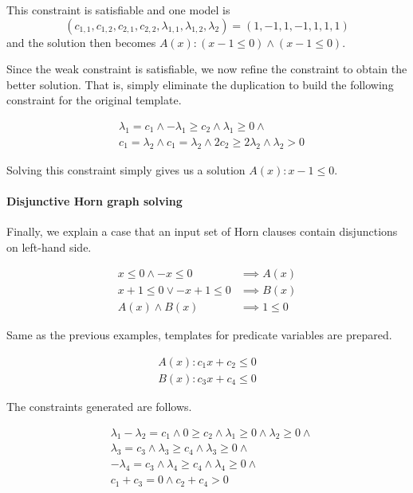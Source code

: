 \documentclass[a4paper,12pt]{article}
\begin{document}
This constraint is satisfiable and one model is
\[ ( c_{1,1}, c_{1,2}, c_{2,1}, c_{2,2}, \lambda_{1,1}, \lambda_{1,2}, \lambda_2 ) =
( 1, -1, 1, -1, 1, 1, 1 ) \] and the solution then becomes
$A(x) : (x -1 \leq 0) \wedge (x -1 \leq 0)$.

Since the weak constraint is satisfiable, we now refine the constraint
to obtain the better solution. That is, simply eliminate the
duplication to build the following constraint for the original template.

\begin{align*}
& \lambda_1 = c_1 \wedge - \lambda_1 \geq c_2 \wedge \lambda_1 \geq 0 \wedge \\
& c_1 = \lambda_2 \wedge c_1 = \lambda_2 \wedge 2 c_2 \geq 2 \lambda_2 \wedge \lambda_2 > 0
\end{align*}

Solving this constraint simply gives us a solution $A(x) : x -1 \leq 0$.

\paragraph {Disjunctive Horn graph solving}
Finally, we explain a case that an input set of Horn clauses contain
disjunctions on left-hand side.

\begin{align*}
x \leq 0 \wedge -x \leq 0 & \implies A(x) \\
x+1 \leq 0 \vee -x+1 \leq 0 & \implies B(x) \\
A(x) \wedge B(x) & \implies 1 \leq 0
\end{align*}

Same as the previous examples, templates for predicate variables are
prepared.

\begin{align*}
A(x) : c_1 x + c_2 \leq 0 \\ B(x) : c_3 x + c_4 \leq 0
\end{align*}

The constraints generated are follows.

\begin{align*}
& \lambda_1 - \lambda_2 = c_1 \wedge 0 \geq c_2 \wedge \lambda_1 \geq 0 \wedge \lambda_2 \geq 0 \wedge \\
& \lambda_3 = c_3 \wedge \lambda_3 \geq c_4 \wedge \lambda_3 \geq 0 \wedge \\
& - \lambda_4 = c_3 \wedge \lambda_4 \geq c_4 \wedge \lambda_4 \geq 0 \wedge \\
& c_1 + c_3 = 0 \wedge c_2 + c_4 > 0
\end{align*}
\end{document}
